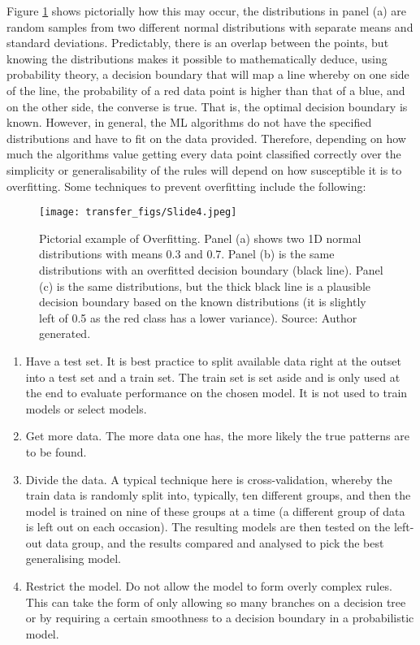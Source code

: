 Figure \ref{fig:overfit} shows pictorially how this may occur, the distributions in panel (a) are random samples from two different normal distributions with separate means and standard deviations. Predictably, there is an overlap between the points, but knowing the distributions makes it possible to mathematically deduce, using probability theory, a decision boundary that will map a line whereby on one side of the line, the probability of a red data point is higher than that of a blue, and on the other side, the converse is true. That is, the optimal decision boundary is known. However, in general, the ML algorithms do not have the specified distributions and have to fit on the data provided. Therefore, depending on how much the algorithms value getting every data point classified correctly over the simplicity or generalisability of the rules will depend on how susceptible it is to overfitting. Some techniques to prevent overfitting include the following:


\begin{figure}
  \texttt{[image: transfer\_figs/Slide4.jpeg]}
  \caption[Pictorial example of Overfitting.]{Pictorial example of Overfitting. Panel (a) shows two 1D normal distributions with means 0.3 and 0.7. Panel (b) is the same distributions with an overfitted decision boundary (black line). Panel (c) is the same distributions, but the thick black line is a plausible decision boundary based on the known distributions (it is slightly left of 0.5 as the red class has a lower variance). Source: Author generated.}
  \label{fig:overfit}
\end{figure}

\begin{enumerate}

\item{Have a test set.} It is best practice to split available data right at the outset into a test set and a train set. The train set is set aside and is only used at the end to evaluate performance on the chosen model. It is not used to train models or select models.

\item{Get more data.} The more data one has, the more likely the true patterns are to be found.

\item{Divide the data.} A typical technique here is cross-validation, whereby the train data is randomly split into, typically, ten different groups, and then the model is trained on nine of these groups at a time (a different group of data is left out on each occasion). The resulting models are then tested on the left-out data group, and the results compared and analysed to pick the best generalising model.

\item{Restrict the model.} Do not allow the model to form overly complex rules. This can take the form of only allowing so many branches on a decision tree or by requiring a certain smoothness to a decision boundary in a probabilistic model.

\end{enumerate} 


